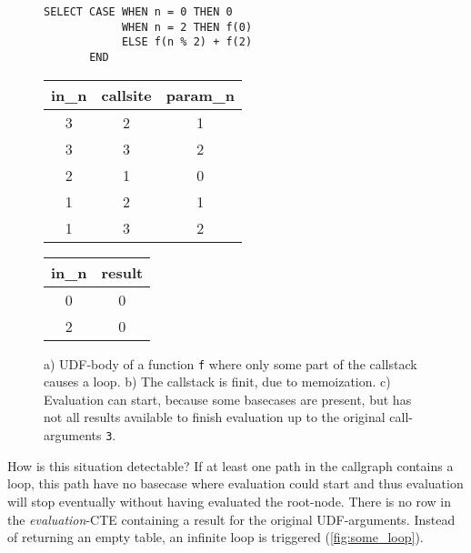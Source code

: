 \begin{figure}[h!]\small
    \begin{minipage}[b]{.45\linewidth}
    \centering
    \begin{verbatim}
SELECT CASE WHEN n = 0 THEN 0
            WHEN n = 2 THEN f(0)
            ELSE f(n % 2) + f(2)
       END
    \end{verbatim}
    \subcaption{}\label{fig:some_loop_udf}
    \end{minipage}%
    \begin{minipage}[b]{.3\linewidth}
    \centering
    \begin{tabular}{c|c|c}
in\_n & callsite & param\_n \\\hline
3 & 2 & 1 \\
3 & 3 & 2 \\
2 & 1 & 0 \\
1 & 2 & 1 \\
1 & 3 & 2
    \end{tabular}
    \subcaption{}\label{fig:some_loop_callstack}
    \end{minipage}
    \begin{minipage}[b]{.2\linewidth}
    \centering
    \begin{tabular}{c|c}
in\_n & result \\\hline
0 & 0 \\\hline
2 & 0 \\
    \end{tabular}
    \subcaption{}\label{fig:some_loop_evaluation}
    \end{minipage}
    \caption{a) UDF-body of a function \texttt{f} where only some part of the callstack causes a loop. b) The callstack is finit, due to memoization. c) Evaluation can start, because some basecases are present, but has not all results available to finish evaluation up to the original call-arguments \texttt{3}.}\label{fig:some_loop}
\end{figure}

How is this situation detectable? If at least one path in the callgraph contains a loop, this path have no basecase where evaluation could start and thus evaluation will stop eventually without having evaluated the root-node. There is no row in the \textit{evaluation}-CTE containing a result for the original UDF-arguments. Instead of returning an empty table, an infinite loop is triggered (\autoref{fig:some_loop}).


\begin{figure}[h!]
    \centering
    \caption{}
    \label{macro:result_collection}
\end{figure}



